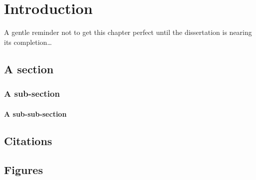 \chapter{Introduction} \label{chap:intro}
A gentle reminder not to get this chapter perfect until the dissertation is nearing its completion\ldots

\section{A section}

\subsection{A sub-section}

\subsubsection{A sub-sub-section}



\section{Citations}



\section{Figures}

